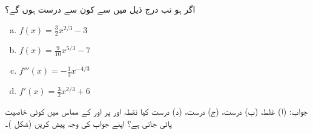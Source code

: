 اگر  ہو تب درج ذیل میں سے کون سے درست ہوں گے؟
\begin{multicols}{2}
\begin{enumerate}[a.]

\item
$f(x)=\tfrac{3}{2}x^{2/3}-3$
\item
$f(x)=\tfrac{9}{10}x^{5/3}-7$
\item
$f'''(x)=-\tfrac{1}{3}x^{-4/3}$
\item
$f'(x)=\tfrac{3}{2}x^{2/3}+6$
\end{enumerate}
\end{multicols}
جواب:\quad
(ا) غلط، (ب) درست، (ج) درست، (د) درست
کیا نقطہ  اور  پر  اور  کے مماس میں کوئی خاصیت پائی جاتی ہے؟ اپنے جواب کی وجہ پیش کریں (شکل )۔
